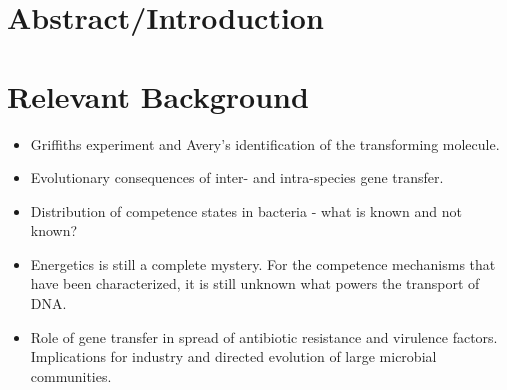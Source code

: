 


\section*{Abstract/Introduction}

\section*{Relevant Background}
\begin{itemize}
	\item Griffiths experiment and Avery's identification of the
		transforming molecule. 
	\item Evolutionary consequences of inter- and intra-species gene transfer. 
	\item Distribution of competence states in bacteria - what is known and
		not known?
	\item Energetics is still a complete mystery. For the competence
		mechanisms that have been characterized, it is
		still unknown what powers the transport of DNA.
	\item Role of gene transfer in spread of antibiotic resistance and
		virulence factors. Implications for industry
		and directed evolution of large microbial communities.
\end{itemize}

